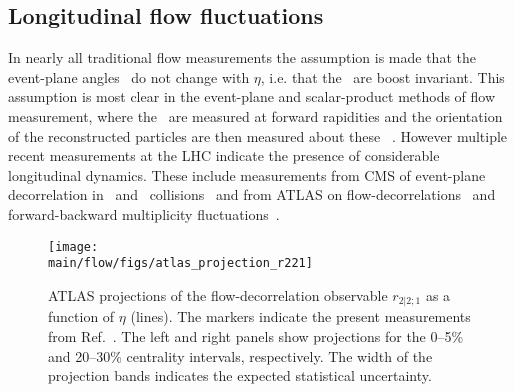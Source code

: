 \subsection{Longitudinal flow fluctuations}

In nearly all traditional flow measurements the assumption is made that the 
  event-plane angles \psin\ do not change with $\eta$, i.e. that the \psin\
  are boost invariant.
This assumption is most clear in the event-plane and scalar-product methods
  of flow measurement,  where the \psin\ are measured at forward rapidities
  and the orientation of the reconstructed particles are then measured about
  these \psin~\cite{HION-2011-01,HION-2016-06}.
However multiple recent measurements at the LHC indicate the presence of 
  considerable longitudinal dynamics.
These include measurements from CMS of event-plane decorrelation in \ppb\ and \pbpb\ 
  collisions~\cite{CMS-HIN-14-012,CMS-HIN-15-008} and from ATLAS on flow-decorrelations~\cite{HION-2016-04}
  and forward-backward multiplicity fluctuations~\cite{HION-2015-13}.




\begin{figure*}[!htb]
\begin{center}
\texttt{[image: \\main/flow/figs/atlas\_projection\_r221]}
\caption{
ATLAS projections of the flow-decorrelation observable $r_{2|2;1}$ 
  as a function of $\eta$ (lines).
The markers indicate the present measurements from Ref.~\cite{HION-2016-04}.
The left and right panels show projections for the 0--5\% and 20--30\%
  centrality intervals, respectively.
The width of the projection bands indicates the expected statistical uncertainty.
}
\label{fig:atlas_r221}
\end{center}
\end{figure*}



